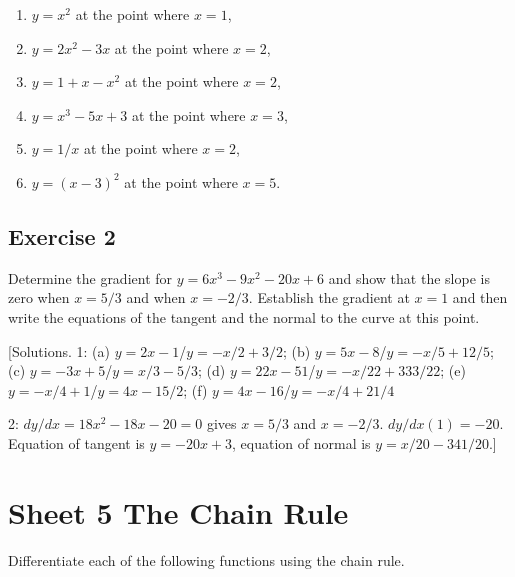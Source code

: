 \documentclass[
  english,
  11pt,
  oneside]{book}
\providecommand{\tightlist}{%
  \setlength{\itemsep}{0pt}\setlength{\parskip}{0pt}}
\newcommand{\slide}{}
\theoremstyle{definition}
\theoremstyle{definition}
\theoremstyle{definition}
\theoremstyle{definition}
\theoremstyle{remark}
\begin{document}
\begin{enumerate}
\def\labelenumi{\alph{enumi}.}
\tightlist
\item
  \(y=x^2\) at the point where \(x=1\),
\item
  \(y=2x^2-3x\) at the point where \(x=2\),
\item
  \(y=1+x-x^2\) at the point where \(x=2\),
\item
  \(y=x^3-5x+3\) at the point where \(x=3\),
\item
  \(y=1/x\) at the point where \(x=2\),
\item
  \(y=(x-3)^2\) at the point where \(x=5\).
\end{enumerate}

\slide

\subsection*{Exercise 2}\label{exercise-2-1}

Determine the gradient for \(y=6x^3-9x^2-20x+6\) and show that the slope is zero when \(x=5/3\) and when \(x=-2/3\). Establish the gradient at \(x=1\) and then write the equations of the tangent and the normal to the curve at this point.

\slide

{[}Solutions. 1: (a) \(y=2x-1\)/\(y=-x/2+3/2\); (b) \(y=5x-8\)/\(y=-x/5+12/5\); (c) \(y=-3x+5\)/\(y=x/3-5/3\); (d) \(y=22x-51\)/\(y=-x/22+333/22\); (e) \(y=-x/4+1\)/\(y=4x-15/2\); (f) \(y=4x-16\)/\(y=-x/4+21/4\)

2: \(dy/dx = 18x^2-18x-20 = 0\) gives \(x=5/3\) and \(x=-2/3\). \(dy/dx(1) = -20\). Equation of tangent is \(y=-20x+3\), equation of normal is \(y=x/20-341/20\).{]}

\slide

\section{Sheet 5 The Chain Rule}\label{sheet-5-the-chain-rule}

Differentiate each of the following functions using the chain rule.
\end{document}
